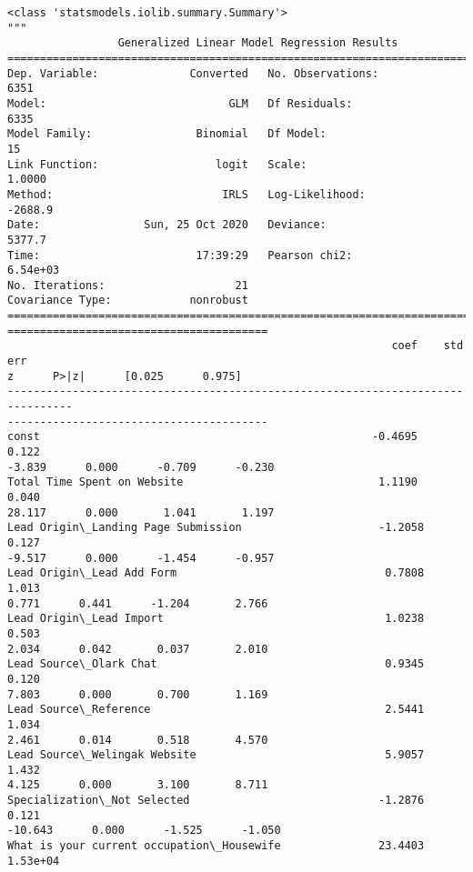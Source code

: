 \documentclass[11pt]{article}
\makeatletter
\newcommand{\boxspacing}{\kern\kvtcb@left@rule\kern\kvtcb@boxsep}
\newcommand{\prompt}[4]{
        \ttfamily\llap{{\color{#2}[#3]:\hspace{3pt}#4}}\vspace{-\baselineskip}
    }
\makeatother
\begin{document}
            \begin{tcolorbox}[breakable, size=fbox, boxrule=.5pt, pad at break*=1mm, opacityfill=0]
\prompt{Out}{outcolor}{77}{\boxspacing}
\begin{Verbatim}[commandchars=\\\{\}]
<class 'statsmodels.iolib.summary.Summary'>
"""
                 Generalized Linear Model Regression Results
==============================================================================
Dep. Variable:              Converted   No. Observations:                 6351
Model:                            GLM   Df Residuals:                     6335
Model Family:                Binomial   Df Model:                           15
Link Function:                  logit   Scale:                          1.0000
Method:                          IRLS   Log-Likelihood:                -2688.9
Date:                Sun, 25 Oct 2020   Deviance:                       5377.7
Time:                        17:39:29   Pearson chi2:                 6.54e+03
No. Iterations:                    21
Covariance Type:            nonrobust
================================================================================
========================================
                                                           coef    std err
z      P>|z|      [0.025      0.975]
--------------------------------------------------------------------------------
----------------------------------------
const                                                   -0.4695      0.122
-3.839      0.000      -0.709      -0.230
Total Time Spent on Website                              1.1190      0.040
28.117      0.000       1.041       1.197
Lead Origin\_Landing Page Submission                     -1.2058      0.127
-9.517      0.000      -1.454      -0.957
Lead Origin\_Lead Add Form                                0.7808      1.013
0.771      0.441      -1.204       2.766
Lead Origin\_Lead Import                                  1.0238      0.503
2.034      0.042       0.037       2.010
Lead Source\_Olark Chat                                   0.9345      0.120
7.803      0.000       0.700       1.169
Lead Source\_Reference                                    2.5441      1.034
2.461      0.014       0.518       4.570
Lead Source\_Welingak Website                             5.9057      1.432
4.125      0.000       3.100       8.711
Specialization\_Not Selected                             -1.2876      0.121
-10.643      0.000      -1.525      -1.050
What is your current occupation\_Housewife               23.4403   1.53e+04

\end{Verbatim}
\end{tcolorbox}
\end{document}
